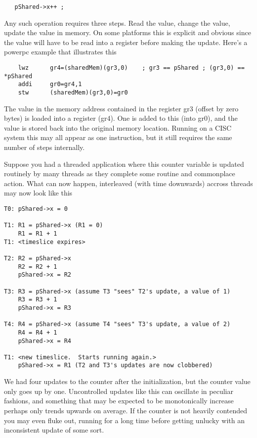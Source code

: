 \begin{lstlisting}
   pShared->x++ ;
\end{lstlisting}

Any such operation requires three steps.  Read the value, change the value, update the value in memory.  On some platforms this is explicit and obvious since the value will have to be read into a register before making the update.  Here's a powerpc example that illustrates this

\begin{lstlisting}
    lwz      gr4=(sharedMem)(gr3,0)    ; gr3 == pShared ; (gr3,0) == *pShared
    addi     gr0=gr4,1
    stw      (sharedMem)(gr3,0)=gr0
\end{lstlisting}

The value in the memory address contained in the register gr3 (offset by zero bytes) is loaded into a register (gr4).  One is added to this (into gr0), and the value is stored back into the original memory location.  Running on a CISC system this may all appear as one instruction, but it still requires the same number of steps internally.

Suppose you had a threaded application where this counter variable is updated routinely by many threads as they complete some routine and commonplace action.  What can now happen, interleaved (with time downwards) accross threads may now look like this

\begin{lstlisting}
T0: pShared->x = 0

T1: R1 = pShared->x (R1 = 0)
    R1 = R1 + 1
T1: <timeslice expires>

T2: R2 = pShared->x
    R2 = R2 + 1
    pShared->x = R2

T3: R3 = pShared->x (assume T3 "sees" T2's update, a value of 1)
    R3 = R3 + 1
    pShared->x = R3

T4: R4 = pShared->x (assume T4 "sees" T3's update, a value of 2)
    R4 = R4 + 1
    pShared->x = R4

T1: <new timeslice.  Starts running again.>
    pShared->x = R1 (T2 and T3's updates are now clobbered)
\end{lstlisting}

We had four updates to the counter after the initialization, but the counter value only goes up by one.  Uncontrolled updates like this can oscillate in peculiar fashions, and something that may be expected to be monotonically increase perhaps only trends upwards on average.  If the counter is not heavily contended you may even fluke out, running for a long time before getting unlucky with an inconsistent update of some sort.

